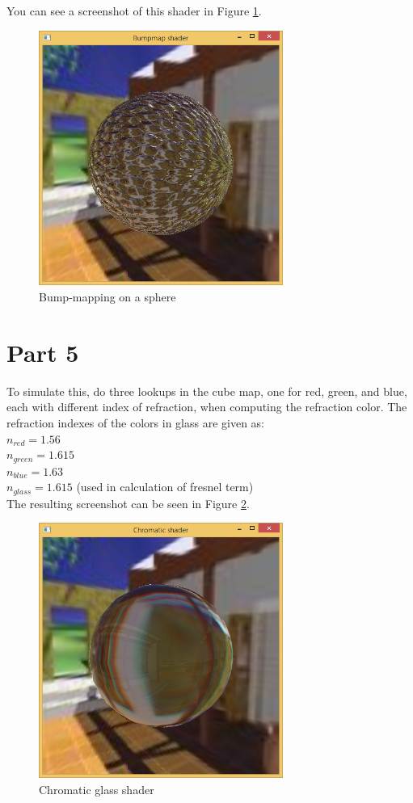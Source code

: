 You can see a screenshot of this shader in Figure \ref{fig:10-4}.


\begin{figure}[hp]
\centering
\includegraphics[width=8cm]{../Screenshots/ex-10/4.png}
\caption{Bump-mapping on a sphere}
\label{fig:10-4}
\end{figure}


\section{Part 5}
\label{sec:del-5}
 
 To simulate this, do three lookups in the cube map, one for red, green, and blue, each with different index of refraction, when computing the refraction color. The refraction indexes of the colors in glass are given as:\\
 
 \noindent
 $n_{red} = 1.56 $ \\
 $n_{green} = 1.615 $ \\
 $n_{blue} = 1.63 $ \\
 $n_{glass} = 1.615 $ (used in calculation of fresnel term) \\
 
 The resulting screenshot can be seen in Figure \ref{fig:10-5}. 


\begin{figure}[hp]
\centering
\includegraphics[width=8cm]{../Screenshots/ex-10/5.png}
\caption{Chromatic glass shader}
\label{fig:10-5}
\end{figure}
